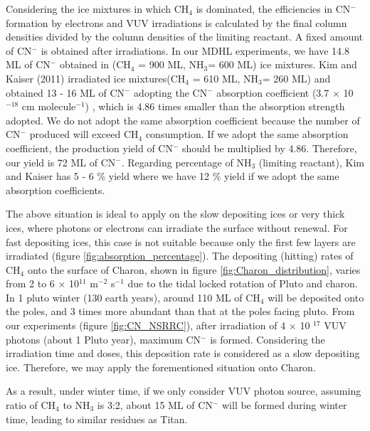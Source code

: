 Considering the ice mixtures in which CH$_4$ is dominated, the efficiencies in CN$^-$ formation by electrons and VUV irradiations is calculated by the final column densities divided by the column densities of the limiting reactant. A fixed amount of CN$^-$ is obtained after irradiations. In our MDHL experiments, we have 14.8 ML of CN$^-$ obtained in (CH$_4$ = 900 ML, NH$_3$= 600 ML) ice mixtures. Kim and Kaiser (2011) irradiated  ice mixtures(CH$_4$ = 610 ML, NH$_3$= 260 ML) and obtained 13 - 16 ML of CN$^-$ adopting the CN$^-$ absorption coefficient (3.7 $\times$ 10$^{-18}$ cm molecule$^{-1}$) \cite{georgieva2006computational}, which is 4.86 times smaller than the absorption strength adopted. We do not adopt the same absorption coefficient because the number of CN$^-$ produced will exceed CH$_4$ consumption. If we adopt the same absorption coefficient, the production yield of CN$^-$ should be multiplied by 4.86. Therefore, our yield is 72 ML of CN$^-$. Regarding percentage of NH$_3$ (limiting reactant), Kim and Kaiser has 5 - 6 \% yield where we have 12 \% yield if we adopt the same absorption coefficients.

The above situation is ideal to apply on the slow depositing ices or very thick ices, where photons or electrons can irradiate the surface without renewal. For fast depositing ices, this case is not suitable because only the first few layers are irradiated (figure \ref{fig:absorption_percentage}). The depositing (hitting) rates of CH$_4$ onto the surface of Charon, shown in figure \ref{fig:Charon_distribution}, varies from 2 to 6 $\times$ 10$^{11}$ m$^{-2}$ s$^{-1}$ due to the tidal locked rotation of Pluto and charon. In 1 pluto winter (130 earth years), around 110 ML of CH$_4$ will be deposited onto the poles, and 3 times more abundant than that at the poles facing pluto. From our experiments (figure \ref{fig:CN_NSRRC}), after irradiation of 4 $\times$ 10 $^{17}$ VUV photons (about 1 Pluto year), maximum CN$^-$ is formed. Considering the irradiation time and doses, this deposition rate is considered as a slow depositing ice. Therefore, we may apply the forementioned situation onto Charon.

As a result, under winter time, if we only consider VUV photon source, assuming ratio of CH$_4$ to NH$_3$ is 3:2, about 15 ML of CN$^-$ will be formed during winter time, leading to similar residues as Titan.


